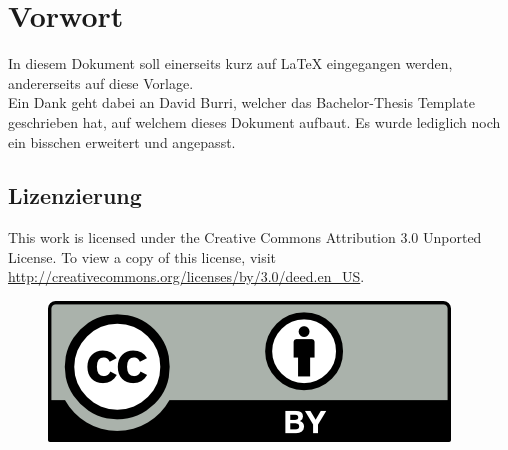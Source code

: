 \chapter*{Vorwort}
\label{chap:vorwort}

In diesem Dokument soll einerseits kurz auf \LaTeX{} eingegangen werden, andererseits auf diese Vorlage.\\
Ein Dank geht dabei an David Burri, welcher das Bachelor-Thesis Template geschrieben hat, auf welchem dieses Dokument aufbaut. Es wurde lediglich noch ein bisschen erweitert und angepasst.


\section{Lizenzierung}
\label{sec:vorwort_lizenz}

This work is licensed under the Creative Commons Attribution 3.0 Unported License. To view a copy of this license, visit
\url{http://creativecommons.org/licenses/by/3.0/deed.en_US}.

\begin{figure}[H]
	\includegraphics[scale=0.7]{bilder/cc_by.png}
	\label{fig:vorwort_cc-by}
\end{figure}
